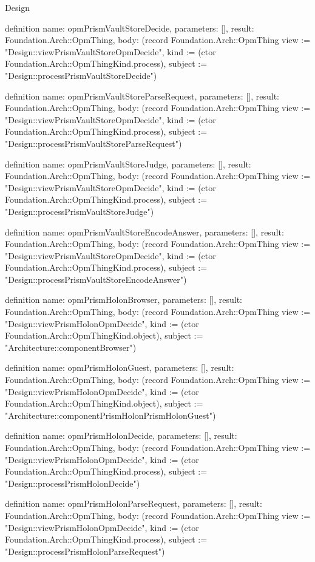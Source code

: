 \begin{lexlean}{Design}
\begin{semanticmodule}
definition{
  name: opmPrismVaultStoreDecide,
  parameters: [],
  result: Foundation.Arch::OpmThing,
  body: (record Foundation.Arch::OpmThing {view := "Design::viewPrismVaultStoreOpmDecide", kind := (ctor Foundation.Arch::OpmThingKind.process), subject := "Design::processPrismVaultStoreDecide"})
}

definition{
  name: opmPrismVaultStoreParseRequest,
  parameters: [],
  result: Foundation.Arch::OpmThing,
  body: (record Foundation.Arch::OpmThing {view := "Design::viewPrismVaultStoreOpmDecide", kind := (ctor Foundation.Arch::OpmThingKind.process), subject := "Design::processPrismVaultStoreParseRequest"})
}

definition{
  name: opmPrismVaultStoreJudge,
  parameters: [],
  result: Foundation.Arch::OpmThing,
  body: (record Foundation.Arch::OpmThing {view := "Design::viewPrismVaultStoreOpmDecide", kind := (ctor Foundation.Arch::OpmThingKind.process), subject := "Design::processPrismVaultStoreJudge"})
}

definition{
  name: opmPrismVaultStoreEncodeAnswer,
  parameters: [],
  result: Foundation.Arch::OpmThing,
  body: (record Foundation.Arch::OpmThing {view := "Design::viewPrismVaultStoreOpmDecide", kind := (ctor Foundation.Arch::OpmThingKind.process), subject := "Design::processPrismVaultStoreEncodeAnswer"})
}

definition{
  name: opmPrismHolonBrowser,
  parameters: [],
  result: Foundation.Arch::OpmThing,
  body: (record Foundation.Arch::OpmThing {view := "Design::viewPrismHolonOpmDecide", kind := (ctor Foundation.Arch::OpmThingKind.object), subject := "Architecture::componentBrowser"})
}

definition{
  name: opmPrismHolonGuest,
  parameters: [],
  result: Foundation.Arch::OpmThing,
  body: (record Foundation.Arch::OpmThing {view := "Design::viewPrismHolonOpmDecide", kind := (ctor Foundation.Arch::OpmThingKind.object), subject := "Architecture::componentPrismHolonPrismHolonGuest"})
}

definition{
  name: opmPrismHolonDecide,
  parameters: [],
  result: Foundation.Arch::OpmThing,
  body: (record Foundation.Arch::OpmThing {view := "Design::viewPrismHolonOpmDecide", kind := (ctor Foundation.Arch::OpmThingKind.process), subject := "Design::processPrismHolonDecide"})
}

definition{
  name: opmPrismHolonParseRequest,
  parameters: [],
  result: Foundation.Arch::OpmThing,
  body: (record Foundation.Arch::OpmThing {view := "Design::viewPrismHolonOpmDecide", kind := (ctor Foundation.Arch::OpmThingKind.process), subject := "Design::processPrismHolonParseRequest"})
}


\end{semanticmodule}
\end{lexlean}
